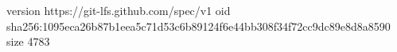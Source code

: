 version https://git-lfs.github.com/spec/v1
oid sha256:1095eca26b87b1eea5c71d53c6b89124f6e44bb308f34f72cc9dc89e8d8a8590
size 4783
